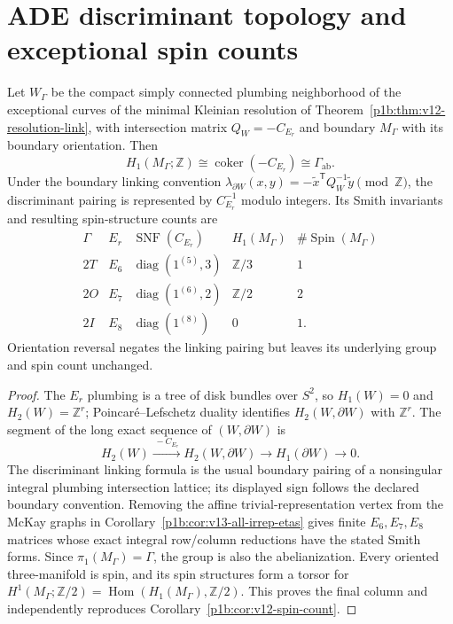 \documentclass[11pt]{article}
\begin{document}
\section{ADE discriminant topology and exceptional spin counts}
\label{p1b:sec:v16-ade-discriminant}
\begin{theorem}
\label{p1b:thm:v16-ade-link-discriminant}
Let $W_\Gamma$ be the compact simply connected plumbing
neighborhood of the exceptional curves of the minimal Kleinian
resolution of Theorem~\ref{p1b:thm:v12-resolution-link}, with
intersection matrix $Q_W=-C_{E_r}$ and boundary $M_\Gamma$
with its boundary orientation. Then
\begin{equation}
\boxed{H_1(M_\Gamma;\mathbb Z)
 \cong\operatorname{coker}(-C_{E_r})
 \cong\Gamma_{\mathrm{ab}}.}
\tag{T16.7}\label{p1b:eq:v16-ade-h1}
\end{equation}
Under the boundary linking convention
$\lambda_{\partial W}(x,y)=-\widetilde x^\mathsf T
 Q_W^{-1}\widetilde y\pmod{\mathbb Z}$, the discriminant pairing
is represented by $C_{E_r}^{-1}$ modulo integers. Its Smith
invariants and resulting spin-structure counts are
\[
\begin{array}{c|c|c|c|c}
\Gamma&E_r&\operatorname{SNF}(C_{E_r})&H_1(M_\Gamma)&
\#\operatorname{Spin}(M_\Gamma)\\\hline
2T&E_6&\operatorname{diag}(1^{(5)},3)&\mathbb Z/3&1\\
2O&E_7&\operatorname{diag}(1^{(6)},2)&\mathbb Z/2&2\\
2I&E_8&\operatorname{diag}(1^{(8)})&0&1.
\end{array}
\]
Orientation reversal negates the linking pairing but leaves its
underlying group and spin count unchanged.
\end{theorem}
\begin{proof}
The $E_r$ plumbing is a tree of disk bundles over
$S^2$, so $H_1(W)=0$ and $H_2(W)=\mathbb Z^r$; Poincar\'e--Lefschetz
duality identifies $H_2(W,\partial W)$ with $\mathbb Z^r$.
The segment of the long exact sequence of $(W,\partial W)$ is
\[H_2(W)\xrightarrow{\,-C_{E_r}\,}H_2(W,\partial W)
 \longrightarrow H_1(\partial W)\longrightarrow 0.
\]
The discriminant linking formula is the usual boundary pairing
of a nonsingular integral plumbing intersection lattice;
its displayed sign follows the declared boundary convention.
Removing the affine trivial-representation vertex from the
McKay graphs in Corollary~\ref{p1b:cor:v13-all-irrep-etas} gives
finite $E_6,E_7,E_8$ matrices whose exact integral row/column
reductions have the stated Smith forms.  Since
$\pi_1(M_\Gamma)=\Gamma$, the group is also the abelianization.
Every oriented three-manifold is spin, and its spin structures
form a torsor for $H^1(M_\Gamma;\mathbb Z/2)
=\operatorname{Hom}(H_1(M_\Gamma),\mathbb Z/2)$.
This proves the final column and independently reproduces
Corollary~\ref{p1b:cor:v12-spin-count}.
\end{proof}
\end{document}
